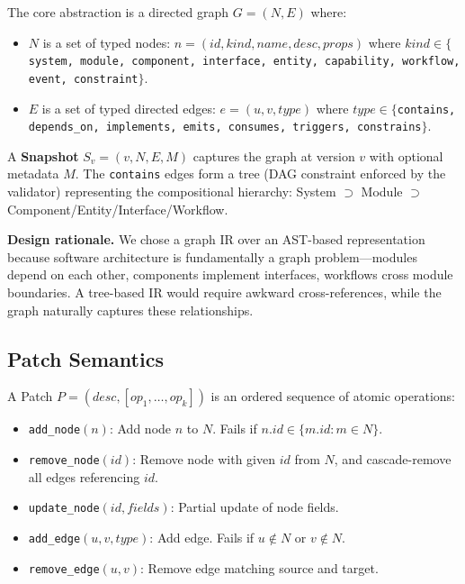 \documentclass[11pt,a4paper]{article}
\begin{document}
The core abstraction is a directed graph $G = (N, E)$ where:

\begin{itemize}
    \item $N$ is a set of typed nodes: $n = (id, kind, name, desc, props)$ where $kind \in \{$\texttt{system, module, component, interface, entity, capability, workflow, event, constraint}$\}$.
    \item $E$ is a set of typed directed edges: $e = (u, v, type)$ where $type \in \{$\texttt{contains, depends\_on, implements, emits, consumes, triggers, constrains}$\}$.
\end{itemize}

A \textbf{Snapshot} $S_v = (v, N, E, M)$ captures the graph at version $v$ with optional metadata $M$. The \texttt{contains} edges form a tree (DAG constraint enforced by the validator) representing the compositional hierarchy: System $\supset$ Module $\supset$ Component/Entity/Interface/Workflow.

\textbf{Design rationale.} We chose a graph IR over an AST-based representation because software architecture is fundamentally a graph problem---modules depend on each other, components implement interfaces, workflows cross module boundaries. A tree-based IR would require awkward cross-references, while the graph naturally captures these relationships.

\subsection{Patch Semantics}

A Patch $P = (desc, [op_1, \ldots, op_k])$ is an ordered sequence of atomic operations:

\begin{itemize}
    \item \texttt{add\_node}$(n)$: Add node $n$ to $N$. Fails if $n.id \in \{m.id : m \in N\}$.
    \item \texttt{remove\_node}$(id)$: Remove node with given $id$ from $N$, and cascade-remove all edges referencing $id$.
    \item \texttt{update\_node}$(id, fields)$: Partial update of node fields.
    \item \texttt{add\_edge}$(u, v, type)$: Add edge. Fails if $u \notin N$ or $v \notin N$.
    \item \texttt{remove\_edge}$(u, v)$: Remove edge matching source and target.
\end{itemize}
\end{document}

